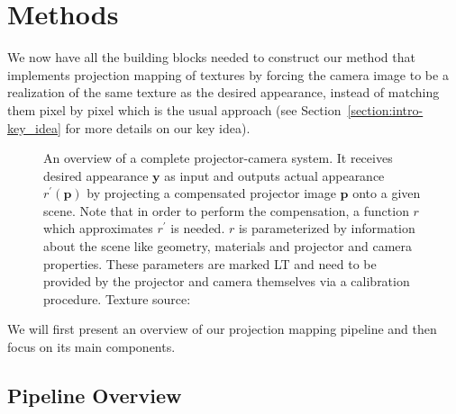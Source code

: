 \chapter{Methods}
\label{chapter:methods}

We now have all the building blocks needed to construct our method that implements projection mapping of textures by forcing the camera image to be a realization of the same texture as the desired appearance, instead of matching them pixel by pixel which is the usual approach (see Section~\ref{section:intro-key_idea} for more details on our key idea).

\begin{figure}[t]
    \centering
    \def\svgwidth{0.8\textwidth}
    
    \caption{An overview of a complete projector-camera system. It receives desired appearance \(\bm{y}\) as input and outputs actual appearance \(r^\prime(\bm{p})\) by projecting a compensated projector image \(\bm{p}\) onto a given scene. Note that in order to perform the compensation, a function \(r\) which approximates \(r^\prime\) is needed. \(r\) is parameterized by information about the scene like geometry, materials and projector and camera properties. These parameters are marked LT and need to be provided by the projector and camera themselves via a calibration procedure. Texture source: \citet{Pixar128}}
    \label{fig:methods_system}
\end{figure}

We will first present an overview of our projection mapping pipeline and then focus on its main components.

\section{Pipeline Overview}
\label{section:methods-pipeline_overview}

